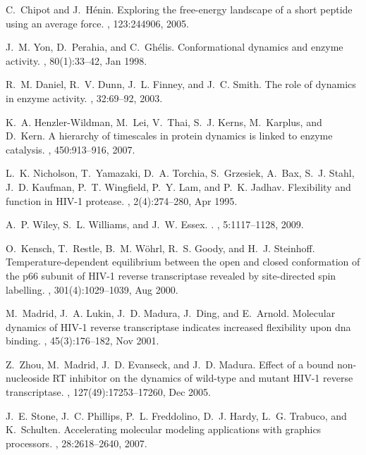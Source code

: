 \begin{thebibliography}{10}
C.~Chipot and J.~H{\'e}nin.
\newblock Exploring the free-energy landscape of a short peptide using an
  average force.
, 123:244906, 2005.

J.~M. Yon, D.~Perahia, and C.~Ghélis.
\newblock Conformational dynamics and enzyme activity.
, 80(1):33--42, Jan 1998.

R.~M. Daniel, R.~V. Dunn, J.~L. Finney, and J.~C. Smith.
\newblock The role of dynamics in enzyme activity.
, 32:69--92, 2003.

K.~A. Henzler-Wildman, M.~Lei, V.~Thai, S.~J. Kerns, M.~Karplus, and D.~Kern.
\newblock A hierarchy of timescales in protein dynamics is linked to enzyme
  catalysis.
, 450:913--916, 2007.

L.~K. Nicholson, T.~Yamazaki, D.~A. Torchia, S.~Grzesiek, A.~Bax, S.~J. Stahl,
  J.~D. Kaufman, P.~T. Wingfield, P.~Y. Lam, and P.~K. Jadhav.
\newblock Flexibility and function in {HIV-1} protease.
, 2(4):274--280, Apr 1995.

A.~P. Wiley, S.~L. Williams, and J.~W. Essex.
.
, 5:1117--1128, 2009.

O.~Kensch, T.~Restle, B.~M. Wöhrl, R.~S. Goody, and H.~J. Steinhoff.
\newblock Temperature-dependent equilibrium between the open and closed
  conformation of the p66 subunit of {HIV-1} reverse transcriptase revealed by
  site-directed spin labelling.
, 301(4):1029--1039, Aug 2000.

M.~Madrid, J.~A. Lukin, J.~D. Madura, J.~Ding, and E.~Arnold.
\newblock Molecular dynamics of {HIV-1} reverse transcriptase indicates
  increased flexibility upon dna binding.
, 45(3):176--182, Nov 2001.

Z.~Zhou, M.~Madrid, J.~D. Evanseck, and J.~D. Madura.
\newblock Effect of a bound non-nucleoside {RT} inhibitor on the dynamics of
  wild-type and mutant {HIV-1} reverse transcriptase.
, 127(49):17253--17260, Dec 2005.

J.~E. Stone, J.~C. Phillips, P.~L. Freddolino, D.~J. Hardy, L.~G. Trabuco, and
  K.~Schulten.
\newblock Accelerating molecular modeling applications with graphics
  processors.
, 28:2618--2640, 2007.


\end{thebibliography}
